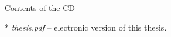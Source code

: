 \newpage
\appendix Contents of the CD

\begitems
* {\em thesis.pdf} -- electronic version of this thesis.
\enditems

